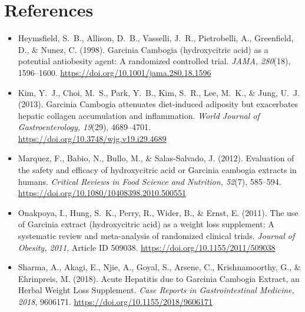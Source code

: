 \documentclass[12pt]{article}
\begin{document}
\section*{References}
\begin{itemize}
    \item Heymsfield, S.~B., Allison, D.~B., Vasselli, J.~R., Pietrobelli, A., Greenfield, D., \& Nunez, C. (1998). Garcinia Cambogia (hydroxycitric acid) as a potential antiobesity agent: A randomized controlled trial. \textit{JAMA, 280}(18), 1596--1600. \url{https://doi.org/10.1001/jama.280.18.1596}
    
    \item Kim, Y.~J., Choi, M.~S., Park, Y.~B., Kim, S.~R., Lee, M.~K., \& Jung, U.~J. (2013). Garcinia Cambogia attenuates diet-induced adiposity but exacerbates hepatic collagen accumulation and inflammation. \textit{World Journal of Gastroenterology, 19}(29), 4689--4701. \url{https://doi.org/10.3748/wjg.v19.i29.4689}
    
    \item Marquez, F., Babio, N., Bullo, M., \& Salas-Salvado, J. (2012). Evaluation of the safety and efficacy of hydroxycitric acid or Garcinia cambogia extracts in humans. \textit{Critical Reviews in Food Science and Nutrition, 52}(7), 585--594. \url{https://doi.org/10.1080/10408398.2010.500551}
    
    \item Onakpoya, I., Hung, S.~K., Perry, R., Wider, B., \& Ernst, E. (2011). The use of Garcinia extract (hydroxycitric acid) as a weight loss supplement: A systematic review and meta-analysis of randomized clinical trials. \textit{Journal of Obesity, 2011}, Article ID 509038. \url{https://doi.org/10.1155/2011/509038}
    
    \item Sharma, A., Akagi, E., Njie, A., Goyal, S., Arsene, C., Krishnamoorthy, G., \& Ehrinpreis, M. (2018). Acute Hepatitis due to Garcinia Cambogia Extract, an Herbal Weight Loss Supplement. \textit{Case Reports in Gastrointestinal Medicine, 2018}, 9606171. \url{https://doi.org/10.1155/2018/9606171}
\end{itemize}
\end{document}
